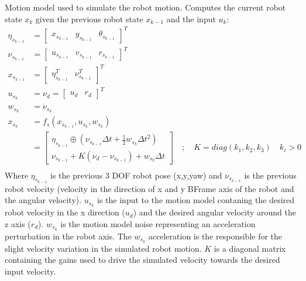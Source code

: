 \documentclass[letterpaper,10pt,english]{sphinxmanual}
\begin{document}
\begin{fulllineitems}
\begin{fulllineitems}
\label{\detokenize{robot_simulation:DifferentialDriveSimulatedRobot.DifferentialDriveSimulatedRobot.fs}}
\pysigstartsignatures
{}
\pysigstopsignatures
\sphinxAtStartPar
Motion model used to simulate the robot motion. Computes the current robot state \(x_k\) given the previous robot state \(x_{k-1}\) and the input \(u_k\):
\begin{equation}\label{equation:robot_simulation:eq:fs}
\begin{split}\eta_{s_{k-1}}&=\begin{bmatrix}x_{s_{k-1}} & y_{s_{k-1}} & \theta_{s_{k-1}}\end{bmatrix}^T\\
\nu_{s_{k-1}}&=\begin{bmatrix} u_{s_{k-1}} &  v_{s_{k-1}} & r_{s_{k-1}}\end{bmatrix}^T\\
x_{s_{k-1}}&=\begin{bmatrix}\eta_{s_{k-1}}^T & \nu_{s_{k-1}}^T\end{bmatrix}^T\\
u_{s_k}&=\nu_{d}=\begin{bmatrix} u_d& r_d\end{bmatrix}^T\\
w_{s_k}&=\dot \nu_{s_k}\\
x_{s_k}&=f_s(x_{s_{k-1}},u_{s_k},w_{s_k}) \\
&=\begin{bmatrix}
\eta_{s_{k-1}} \oplus (\nu_{s_{k-1}}\Delta t + \frac{1}{2} w_{s_k} \Delta t^2) \\
\nu_{s_{k-1}}+K(\nu_{d}-\nu_{s_{k-1}}) + w_{s_k} \Delta t
\end{bmatrix} \quad;\quad K=diag(k_1,k_2,k_3) \quad k_i>0\\\end{split}
\end{equation}
\sphinxAtStartPar
Where \(\eta_{s_{k-1}}\) is the previous 3 DOF robot pose (x,y,yaw) and \(\nu_{s_{k-1}}\) is the previous robot velocity (velocity in the direction of x and y B\sphinxhyphen{}Frame axis of the robot and the angular velocity).
\(u_{s_k}\) is the input to the motion model contaning the desired robot velocity in the x direction (\(u_d\)) and the desired angular velocity around the z axis (\(r_d\)).
\(w_{s_k}\) is the motion model noise representing an acceleration perturbation in the robot axis. The \(w_{s_k}\) acceleration is the responsible for the slight velocity variation in the simulated robot motion.
\(K\) is a diagonal matrix containing the gains used to drive the simulated velocity towards the desired input velocity.


\end{fulllineitems}
\end{fulllineitems}
\end{document}
